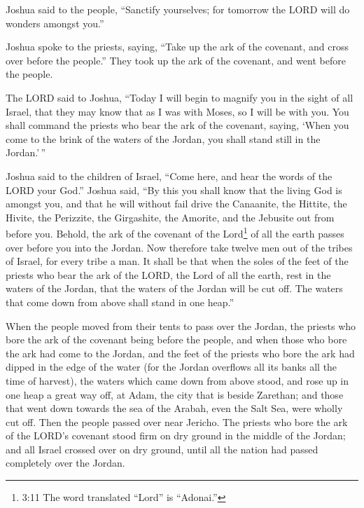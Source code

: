  Joshua said to the people, ``Sanctify yourselves; for
tomorrow the LORD will do wonders amongst you.''

 Joshua spoke to the priests, saying, ``Take up the ark of
the covenant, and cross over before the people.'' They took up the ark
of the covenant, and went before the people.

 The LORD said to Joshua, ``Today I will begin to magnify
you in the sight of all Israel, that they may know that as I was with
Moses, so I will be with you.  You shall command the priests
who bear the ark of the covenant, saying, `When you come to the brink of
the waters of the Jordan, you shall stand still in the Jordan.'\,''

 Joshua said to the children of Israel, ``Come here, and
hear the words of the LORD your God.''  Joshua said, ``By
this you shall know that the living God is amongst you, and that he will
without fail drive the Canaanite, the Hittite, the Hivite, the
Perizzite, the Girgashite, the Amorite, and the Jebusite out from before
you.  Behold, the ark of the covenant of the
Lord\footnote{3:11 The word translated ``Lord'' is ``Adonai.''} of all
the earth passes over before you into the Jordan.  Now
therefore take twelve men out of the tribes of Israel, for every tribe a
man.  It shall be that when the soles of the feet of the
priests who bear the ark of the LORD, the Lord of all the earth, rest in
the waters of the Jordan, that the waters of the Jordan will be cut off.
The waters that come down from above shall stand in one heap.''

 When the people moved from their tents to pass over the
Jordan, the priests who bore the ark of the covenant being before the
people,  and when those who bore the ark had come to the
Jordan, and the feet of the priests who bore the ark had dipped in the
edge of the water (for the Jordan overflows all its banks all the time
of harvest),  the waters which came down from above stood,
and rose up in one heap a great way off, at Adam, the city that is
beside Zarethan; and those that went down towards the sea of the Arabah,
even the Salt Sea, were wholly cut off. Then the people passed over near
Jericho.  The priests who bore the ark of the LORD's
covenant stood firm on dry ground in the middle of the Jordan; and all
Israel crossed over on dry ground, until all the nation had passed
completely over the Jordan.

